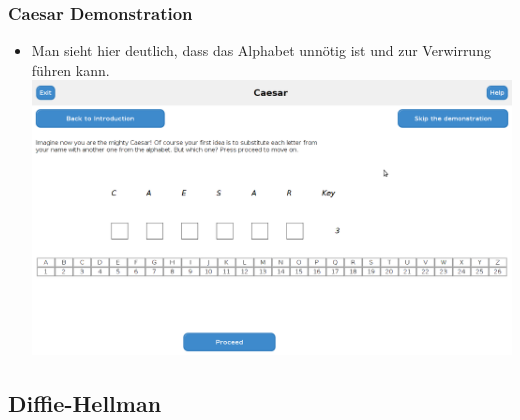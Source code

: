 \documentclass{article}
\begin{document}
   \subsubsection{Caesar Demonstration}
    \begin{itemize}
     \item Man sieht hier deutlich, dass das Alphabet unnötig ist und zur Verwirrung führen kann.\newline
           \includegraphics[width=15cm]{resources/caesarDemoUsability.png}
    \end{itemize}
   \subsection{Diffie-Hellman}
\end{document}
